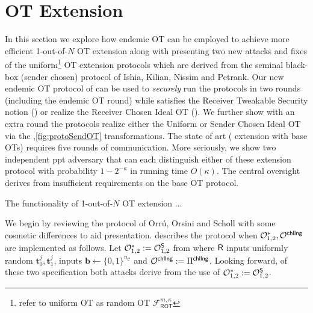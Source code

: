 

\newcommand{\rr}{\ensuremath{\boldsymbol{r}}}
\renewcommand{\tt}{\ensuremath{\boldsymbol{t}}}
\newcommand{\ww}{\ensuremath{\boldsymbol{w}}}
\newcommand{\cc}{\ensuremath{\boldsymbol{c}}}
\newcommand{\uu}{\ensuremath{\boldsymbol{u}}}
\newcommand{\qq}{\ensuremath{\boldsymbol{q}}}
\newcommand{\bb}{\ensuremath{\boldsymbol{b}}}
\newcommand{\vv}{\ensuremath{\boldsymbol{v}}}
\newcommand{\nc}{\ensuremath{{n_\mathcal{C}}}}
\newcommand{\kc}{\ensuremath{{k_\mathcal{C}}}}
\newcommand{\dc}{\ensuremath{{d_\mathcal{C}}}}

\section{OT Extension}


In this section we explore how endemic OT can be employed to achieve more efficient 1-out-of-$N$ OT extension along with presenting two new attacks and fixes of the uniform\footnote{\cite{KOS15, OOS16} refer to uniform OT as random OT $\mathcal{F}^{m,\kappa}_{\textsf{ROT}}$} OT extension protocols\cite{KOS15, OOS16} which are derived from the seminal black-box (sender chosen) protocol of Ishia, Kilian, Nissim and Petrank\cite{IKNP03}. Our new endemic OT protocol of  can be used to \emph{securely} run the protocols in two rounds (including the endemic OT round) while satisfies the Receiver Tweakable Security notion () or realize the Receiver Chosen Ideal OT (). We further show with an extra round the \cite{KOS15, OOS16} protocols realize either the Uniform or Sender Chosen Ideal OT via the ,\ref{fig:protoSendOT} transformations. The state of art (\cite{OOS16,KOS15} extension with \cite{simplestOT} base OTs) requires five rounds of communication. More seriously, we show two independent ppt adversary that can each distinguish either of these extension protocol with probability $1-2^{-\kappa}$ in running time $O(\kappa)$. The central oversight derives from insufficient requirements on the base OT protocol.

The functionality of 1-out-of-$N$ OT extension ...

We begin by reviewing the protocol of Orr\'u, Orsini and Scholl\cite{OOS16} with some cosmetic differences to aid presentation.  describes the \cite{OOS16} protocol when $\mathcal{O}^*_{1,2},\mathcal{O}^{\textsf{chllng}}$ are implemented as follows.  Let $\mathcal{O}^*_{1,2}:=\mathcal{O}^\mathsf{S}_{1,2}$ from  where $\mathsf{R}$ inputs uniformly random $\tt^j_0,\tt^j_1$, \send inputs $\bb\gets\{0,1\}^\nc$ and $\mathcal{O}^{\textsf{chllng}}:=\Pi^{\textsf{chllng}}$. Looking forward, of these two specification both attacks derive from the use of $\mathcal{O}^*_{1,2}:=\mathcal{O}^\mathsf{S}_{1,2}$. 

